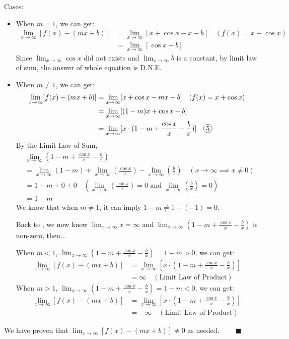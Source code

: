 \documentclass[12pt]{exam}
\newcommand*\circled[1]{\tikz[baseline=(char.base)]{
    \node[shape=circle, draw, inner sep=1pt, 
        minimum height=12pt] (char) {#1};}}
\begin{document}
\begin{enumerate}
\begin{enumerate}
		Cases:
		\begin{itemize}
		    \item When $m=1$, we can get:
		    \begin{align*}
		        \lim_{x \to \infty}[f(x)-(mx+b)]&=\lim_{x \to \infty}[x+\cos{x}-x-b]\quad(f(x)=x+\cos{x})\\
		        &=\lim_{x \to \infty}[\cos{x}-b]
		    \end{align*}
		    Since $\lim_{x \to \infty}\cos{x}$ did not exists and $\lim_{x \to \infty}b$ is a constant, by limit law of sum, the answer of whole equation is D.N.E.
		    \item When $m\neq1$, we can get:
		    \begin{align*}
		        \lim_{x \to \infty}[f(x)-(mx+b)]&=\lim_{x \to \infty}[x+\cos{x}-mx-b]\quad(f(x)=x+\cos{x})\\
		        &=\lim_{x \to \infty}[(1-m)x+\cos{x}-b]\\
		        &=\lim_{x \to \infty}[x\cdot(1-m+\frac{\cos{x}}{x}-\frac{b}{x})] \quad\circled{5}
		    \end{align*}
		    By the Limit Law of Sum,
		    \begin{align*}
				&\lim_{x \to \infty}(1-m+\frac{\cos{x}}{x}-\frac{b}{x})\\
				&=\lim_{x \to \infty}(1-m)+\lim_{x \to \infty}(\frac{\cos{x}}{x})-\lim_{x \to \infty}(\frac{b}{x}) \quad (x \to \infty \implies x \neq 0)\\
		        &=1-m+0+0\quad(\lim_{x \to \infty}(\frac{\cos{x}}{x})=0\mbox{ and }\lim_{x \to \infty}(\frac{b}{x})=0)\\
		        &=1-m
		    \end{align*}
		    We know that when $m\neq1$, it can imply $1-m\neq1+(-1)=0$. 
		    
		    Back to \circled{5}, we now know $\lim_{x \to \infty}x=\infty$ and $\lim_{x \to \infty}(1-m+\frac{\cos{x}}{x}-\frac{b}{x})$ is non-zero, then...
		    
		    When $m<1$, $\lim_{x \to \infty}(1-m+\frac{\cos{x}}{x}-\frac{b}{x})=1-m>0$, we can get:
		    \begin{align*}
		        \lim_{x \to \infty}[f(x)-(mx+b)]&=\lim_{x \to \infty}[x\cdot(1-m+\frac{\cos{x}}{x}-\frac{b}{x})]\\
		        &=\infty\quad(\mbox{Limit Law of Product})
		    \end{align*}
		    When $m>1$, $\lim_{x \to \infty}(1-m+\frac{\cos{x}}{x}-\frac{b}{x})=1-m<0$, we can get:
		    \begin{align*}
		         \lim_{x \to \infty}[f(x)-(mx+b)]&=\lim_{x \to \infty}[x\cdot(1-m+\frac{\cos{x}}{x}-\frac{b}{x})]\\
		        &=-\infty\quad(\mbox{Limit Law of Product})
		    \end{align*}
		\end{itemize}
		We have proven that $\lim_{x \to \infty}[f(x)-(mx+b)]\neq0$ as needed. $\qquad\blacksquare$
		

\end{enumerate}
\end{enumerate}
\end{document}
